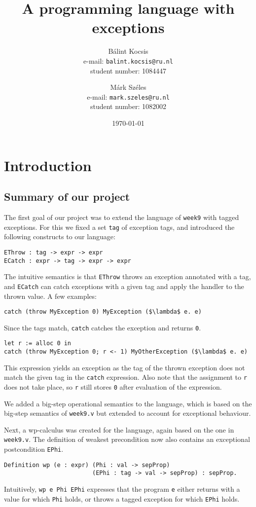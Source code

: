 \documentclass{article}
\title{A programming language with exceptions}
\author{Bálint Kocsis \\ e-mail: \texttt{balint.kocsis@ru.nl} \\ student number: 1084447
\and
Márk Széles \\ e-mail: \texttt{mark.szeles@ru.nl} \\ student number: 1082002}
\date{\today}
\begin{document}
\maketitle

\section{Introduction}

\subsection{Summary of our project}

The first goal of our project was to extend the language of \texttt{week9} with tagged exceptions. For this we fixed a set \texttt{tag} of
exception tags, and introduced the following constructs to our language:
\begin{lstlisting}
EThrow : tag -> expr -> expr
ECatch : expr -> tag -> expr -> expr
\end{lstlisting}
The intuitive semantics is that \texttt{EThrow} throws an exception annotated with a tag, and \texttt{ECatch} can catch exceptions with a
given tag and apply the handler to the thrown value. A few examples:
\begin{lstlisting}[mathescape]
catch (throw MyException 0) MyException ($\lambda$ e. e)
\end{lstlisting}
Since the tags match, \texttt{catch} catches the exception and returns \texttt{0}.
\begin{lstlisting}[mathescape]
let r := alloc 0 in
catch (throw MyException 0; r <- 1) MyOtherException ($\lambda$ e. e)
\end{lstlisting}
This expression yields an exception as the tag of the thrown exception does not match the given tag in the \texttt{catch} expression.
Also note that the assignment to \texttt{r} does not take place, so \texttt{r} still stores \texttt{0} after evaluation of the expression.

We added a big-step operational semantics to the language, which is based on the big-step semantics of \texttt{week9.v} but extended
to account for exceptional behaviour.

Next, a wp-calculus was created for the language, again based on the one in \texttt{week9.v}. The definition of weakest precondition now
also contains an exceptional postcondition \texttt{EPhi}.
\begin{lstlisting}
Definition wp (e : expr) (Phi : val -> sepProp)
                         (EPhi : tag -> val -> sepProp) : sepProp.
\end{lstlisting}
Intuitively, \texttt{wp e Phi EPhi} expresses that the program \texttt{e} either returns with a value for which \texttt{Phi} holds, or throws a
tagged exception for which \texttt{EPhi} holds.
\end{document}
